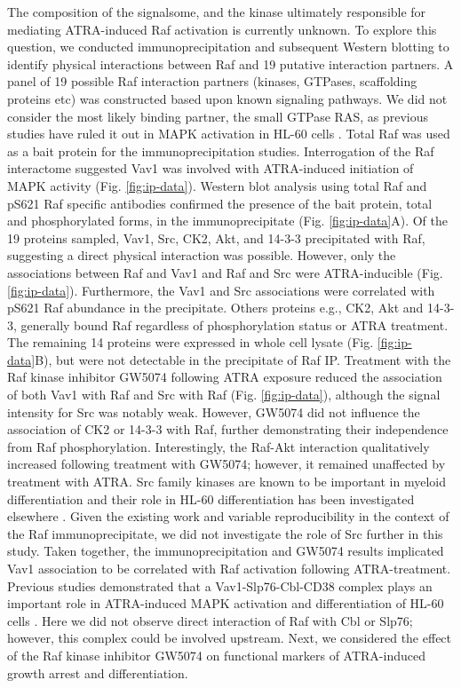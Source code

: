 \documentclass[12pt]{article}
\begin{document}
The composition of the signalsome, and the kinase ultimately responsible for mediating ATRA-induced Raf activation is currently unknown.
To explore this question, we conducted immunoprecipitation and subsequent Western blotting to identify physical interactions between Raf and 19 putative interaction partners.
A panel of 19 possible Raf interaction partners (kinases, GTPases, scaffolding proteins etc)
was constructed based upon known signaling pathways.
We did not consider the most likely binding partner,
the small GTPase RAS, as previous studies have ruled it out in MAPK activation in HL-60 cells \cite{Wang2008,Katagiri1994}.
Total Raf was used as a bait protein for the immunoprecipitation studies.
Interrogation of the Raf interactome suggested Vav1 was involved with ATRA-induced initiation of MAPK activity (Fig. \ref{fig:ip-data}).
Western blot analysis using total Raf and pS621 Raf specific antibodies confirmed the
presence of the bait protein, total and phosphorylated forms, in the immunoprecipitate (Fig. \ref{fig:ip-data}A).
Of the 19 proteins sampled, Vav1, Src, CK2, Akt, and 14-3-3 precipitated with Raf, suggesting a direct physical interaction was possible.
However, only the associations between Raf and Vav1 and Raf and Src were ATRA-inducible (Fig. \ref{fig:ip-data}).
Furthermore, the Vav1 and Src associations were correlated with pS621 Raf abundance in the precipitate.
Others proteins e.g., CK2, Akt and 14-3-3, generally bound Raf regardless of phosphorylation status or ATRA treatment.
The remaining 14 proteins were expressed in whole cell lysate (Fig. \ref{fig:ip-data}B),
but were not detectable in the precipitate of Raf IP.
Treatment with the Raf kinase inhibitor GW5074 following ATRA exposure reduced the association of both Vav1 with Raf and Src with Raf (Fig. \ref{fig:ip-data}),
although the signal intensity for Src was notably weak.
However, GW5074 did not influence the association of CK2 or 14-3-3 with Raf, further demonstrating their independence from Raf phosphorylation.
Interestingly, the Raf-Akt interaction qualitatively increased following treatment with GW5074;
however, it remained unaffected by treatment with ATRA.
Src family kinases are known to be important in myeloid differentiation \cite{Miranda2007} and their role in HL-60 differentiation has been investigated elsewhere \cite{Congleton:2012fk}.
Given the existing work and variable reproducibility in the context of the Raf immunoprecipitate,
we did not investigate the role of Src further in this study.
Taken together, the immunoprecipitation and GW5074 results implicated Vav1 association to be correlated with Raf activation following ATRA-treatment.
Previous studies demonstrated that a Vav1-Slp76-Cbl-CD38 complex plays an important role in ATRA-induced MAPK activation and differentiation of HL-60 cells \cite{Shen2009}.
Here we did not observe direct interaction of Raf with Cbl or Slp76;
however, this complex could be involved upstream. Next, we considered the effect of the Raf kinase inhibitor GW5074 on functional markers of ATRA-induced growth arrest and differentiation.
\end{document}
